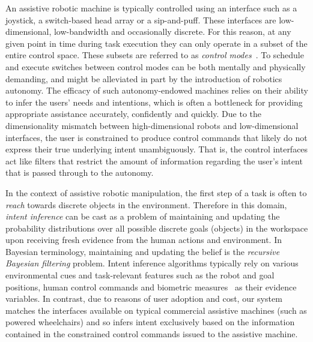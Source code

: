 \documentclass[conference]{IEEEtran}
\begin{document}
An assistive robotic machine is typically controlled using an interface such as a joystick, a switch-based head array or a sip-and-puff. These interfaces are low-dimensional, low-bandwidth and occasionally discrete. For this reason, at any given point in time during task execution they can only operate in a subset of the entire control space. These subsets are referred to as \textit{control modes}~\citep{simpson2008tooth}. To schedule and execute switches between control modes can be both mentally and physically demanding, and might be alleviated in part by the introduction of robotics autonomy. The efficacy of such autonomy-endowed machines relies on their ability to infer the users' needs and intentions, which is often a bottleneck for providing appropriate assistance accurately, confidently and quickly. Due to the dimensionality mismatch between high-dimensional robots and low-dimensional interfaces, the user is constrained to produce control commands that likely do not express their true underlying intent unambiguously. That is, the control interfaces act like filters that restrict the amount of information regarding the user's intent that is passed through to the autonomy. 

In the context of assistive robotic manipulation, the first step of a task is often to \textit{reach} towards discrete objects in the environment. Therefore in this domain, \textit{intent inference} can be cast as a problem of maintaining and updating the probability distributions over all possible discrete goals (objects) in the workspace upon receiving fresh evidence from the human actions and environment. In Bayesian terminology, maintaining and updating the belief is the \textit{recursive Bayesian filtering} problem. Intent inference algorithms typically rely on various environmental cues and task-relevant features such as the robot and goal positions, human control commands and biometric measures~\citep{croft2003estimating} as their evidence variables. In contrast, due to reasons of user adoption and cost, our system matches the interfaces available on typical commercial assistive machines (such as powered wheelchairs) and so infers intent exclusively based on the information contained in the constrained control commands issued to the assistive machine. 
\end{document}
